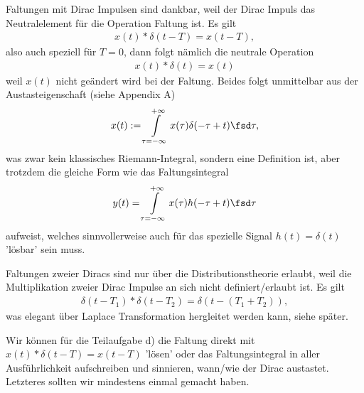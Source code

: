 \begin{Werkzeug}
Faltungen mit Dirac Impulsen sind dankbar, weil der Dirac Impuls das
Neutralelement für die Operation Faltung ist.
Es gilt
\begin{align}
x(t) \ast \delta(t-T) = x(t-T),
\end{align}
also auch speziell für $T=0$, dann folgt nämlich die neutrale Operation
\begin{align}
x(t) \ast \delta(t) = x(t)
\end{align}
weil $x(t)$ nicht geändert wird bei der Faltung.
%
Beides folgt unmittelbar aus der Austasteigenschaft (siehe Appendix A)
\begin{align}
x(t) := \int\limits_{\tau = -\infty}^{+\infty} x(\tau) \delta(-\tau+t) \fsd \tau,
\end{align}
was zwar kein klassisches Riemann-Integral, sondern eine Definition ist, aber trotzdem die gleiche Form wie
das Faltungsintegral
\begin{align}
y(t) = \int\limits_{\tau = -\infty}^{+\infty} x(\tau) h(-\tau+t) \fsd \tau
\end{align}
aufweist, welches sinnvollerweise auch für das spezielle Signal $h(t) = \delta(t)$ 'lösbar'
sein muss.

Faltungen zweier Diracs sind nur über die Distributionstheorie erlaubt, weil die Multiplikation zweier Dirac Impulse an sich nicht definiert/erlaubt ist.
Es gilt
\begin{align}
\delta(t-T_1) \ast \delta(t-T_2) = \delta(t-(T_1+T_2)),
\end{align}
was elegant über Laplace Transformation hergleitet werden kann, siehe später.


\end{Werkzeug}
\begin{Ansatz}
Wir können für die Teilaufgabe d) die Faltung direkt mit $x(t) \ast \delta(t-T) = x(t-T)$ 'lösen' oder das
Faltungsintegral in aller Ausführlichkeit aufschreiben und sinnieren, wann/wie der Dirac austastet.
Letzteres sollten wir mindestens einmal gemacht haben.
\end{Ansatz}

